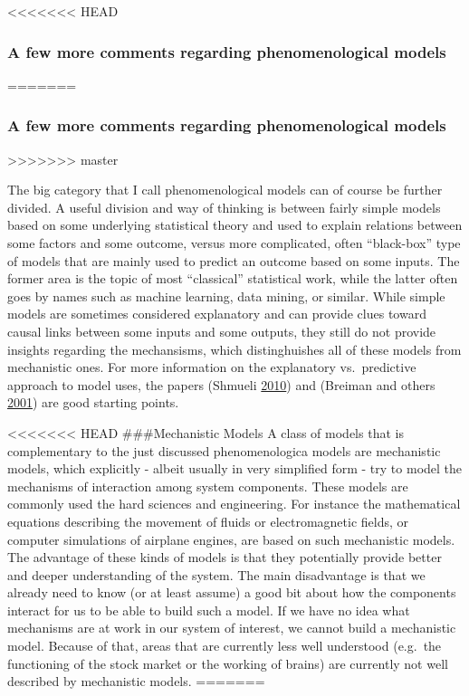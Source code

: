 \documentclass[]{book}
\theoremstyle{definition}
\theoremstyle{definition}
\theoremstyle{definition}
\theoremstyle{remark}
\begin{document}
<<<<<<< HEAD
\hypertarget{mynotebox}{%
\subsubsection{A few more comments regarding phenomenological
models}\label{mynotebox}}
=======
\subsubsection{A few more comments regarding phenomenological
models}\label{mynotebox}
>>>>>>> master

The big category that I call phenomenological models can of course be
further divided. A useful division and way of thinking is between fairly
simple models based on some underlying statistical theory and used to
explain relations between some factors and some outcome, versus more
complicated, often ``black-box'' type of models that are mainly used to
predict an outcome based on some inputs. The former area is the topic of
most ``classical'' statistical work, while the latter often goes by
names such as machine learning, data mining, or similar. While simple
models are sometimes considered explanatory and can provide clues toward
causal links between some inputs and some outputs, they still do not
provide insights regarding the mechansisms, which distinghuishes all of
these models from mechanistic ones. For more information on the
explanatory vs.~predictive approach to model uses, the papers (Shmueli
\protect\hyperlink{ref-shmueli10}{2010}) and (Breiman and others
\protect\hyperlink{ref-breiman01}{2001}) are good starting points.

<<<<<<< HEAD
\#\#\#Mechanistic Models A class of models that is complementary to the
just discussed phenomenologica models are mechanistic models, which
explicitly - albeit usually in very simplified form - try to model the
mechanisms of interaction among system components. These models are
commonly used the hard sciences and engineering. For instance the
mathematical equations describing the movement of fluids or
electromagnetic fields, or computer simulations of airplane engines, are
based on such mechanistic models. The advantage of these kinds of models
is that they potentially provide better and deeper understanding of the
system. The main disadvantage is that we already need to know (or at
least assume) a good bit about how the components interact for us to be
able to build such a model. If we have no idea what mechanisms are at
work in our system of interest, we cannot build a mechanistic model.
Because of that, areas that are currently less well understood (e.g.~the
functioning of the stock market or the working of brains) are currently
not well described by mechanistic models.
=======
\end{document}
